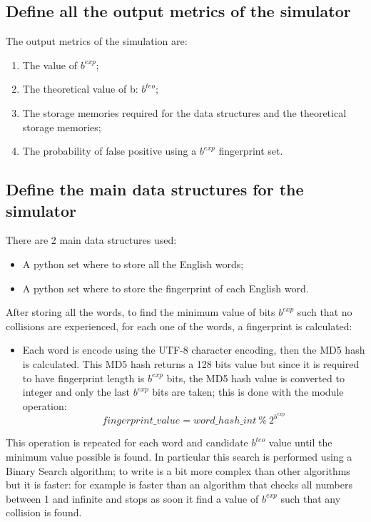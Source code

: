 \documentclass{report}
\begin{document}
{				\subsection{Define all the output metrics of the simulator}
					The output metrics of the simulation are:
					\begin{enumerate}
							\item The value of $b^{exp}$;
							\item The theoretical value of b: $b^{teo}$;
							\item The storage  memories required for the data structures and the theoretical storage memories;
							\item The probability of false positive using a  $b^{exp}$ fingerprint set.
					\end{enumerate}
			
			\subsection{Define the main data structures for the simulator}
						There are 2 main data structures used: 
							\begin{itemize}
								\item A python set where to store all the English words;
								\item A python set where to store the fingerprint of each English word.
								\end{itemize}
						After storing all the words, to find the minimum value of bits $b^{exp}$ such that no collisions are experienced, for each one of the words, a fingerprint is calculated:
						\begin{itemize}
								\item[] Each word is encode using the UTF-8 character encoding, then the MD5 hash is calculated. This MD5 hash returns a 128 bits value but since it is required to have fingerprint length is $b^{exp}$ bits, the MD5 hash value is converted to integer and only the last  $b^{exp}$ bits are taken; this is done with the module operation: \[ fingerprint\_value = word\_hash\_int \: \% \: 2^{b^{exp}} \]
						\end{itemize}
						This operation is repeated for each word and candidate $b^{teo}$ value until the minimum value possible is found. In particular this search is performed using a Binary Search algorithm; to write is a bit more complex than other algorithms but it is faster: for example is faster than an algorithm that checks all numbers between 1 and infinite and stops as soon it find a value of $b^{exp}$ such that any collision is found.
					
}
\end{document}
